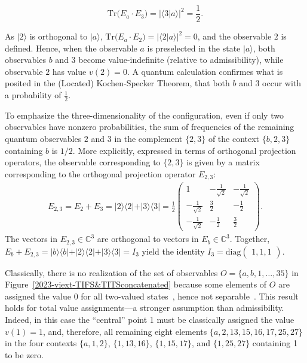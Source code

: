 \documentclass[%
 superscriptaddress,
  preprint,
 showpacs,
 showkeys,
 nofootinbib,
  amsmath,amssymb,
  aps,
 pra,
  longbibliography,
  floatfix,
 ]{revtex4-2}
\theoremstyle{definition}
\newcommand{\C}{\mathbb{C}}
\begin{document}
\begin{equation*}
\text{Tr}\big(E_a \cdot E_3 \big) = \vert \langle 3 \vert a \rangle \vert^2 = \frac12.
\end{equation*}

As $\vert 2 \rangle$ is orthogonal to $\vert a \rangle$,
$\text{Tr}\big(E_a \cdot E_2 \big) = \vert \langle 2 \vert a \rangle \vert^2 = 0$,
and the observable $2$ is defined.
Hence, when the observable $a$ is preselected in the state $\vert a \rangle$, both observables $b$ and $3$ become value-indefinite (relative to admissibility),
while observable $2$ has value  $v(2) = 0$.
A quantum calculation confirmes what is posited in the (Located) Kochen-Specker Theorem,
that both $b$ and $3$ occur with a probability of $\frac12$.


To emphasize the three-dimensionality of the configuration, even if only two observables have nonzero probabilities,  the sum of frequencies of the remaining quantum observables $2$ and $3$
 in the complement  $\{2,3\}$ of the context $\{b,2,3\}$ containing $b$ is $1/2$.
More explicitly, expressed in terms of orthogonal projection operators, the observable corresponding to $\{2,3\}$
is given by a  matrix  corresponding to the orthogonal projection operator $E_{2,3}$:
\begin{equation*}
\begin{split}
E_{2,3}=E_2 + E_3 = \vert 2 \rangle \langle 2 \vert + \vert 3 \rangle \langle 3 \vert
= \frac12
\begin{pmatrix}
1 & -\frac1{\sqrt{2}}& -\frac1{\sqrt{2}}\\
-\frac1{\sqrt{2}}& \frac32& -\frac12\\
-\frac1{\sqrt{2}}& -\frac12& \frac32
\end{pmatrix}
.
\end{split}
\end{equation*}
The vectors in $E_{2,3}\in \C^3$ are orthogonal to vectors in  $E_{b}\in \C^3$.
Together, $E_b+E_{2,3} =\vert b \rangle \langle b \vert +\vert 2 \rangle \langle 2 \vert + \vert 3 \rangle \langle 3 \vert =I_3$ yield
the identity $I_3=\text{diag}\begin{pmatrix}1,1,1\end{pmatrix}$.

Classically, there is no realization of the set of observables $O=\{ a, b, 1,\ldots , 35\}$ in Figure~\ref{2023-viext-TIFS&TITSconcatenated} because
some elements of $O$ are assigned the value $0$ for all two-valued states~\cite[Table~24.1]{Svozil-2018-p}, hence
not separable~\cite[Theorem~0]{kochen1}.  This result holds for total value assignments---a stronger assumption than admissibility.
Indeed, in this case  the ``central'' point 1 must be classically assigned the value $v(1)=1$,
and, therefore, all remaining eight elements
$\{a, 2, 13, 15, 16, 17, 25, 27\}$
in the four contexts
$\{a,1,2\}$, $\{1,13,16\}$, $\{1,15,17\}$, and $\{1,25,27\}$ containing 1 to be zero.
\end{document}
